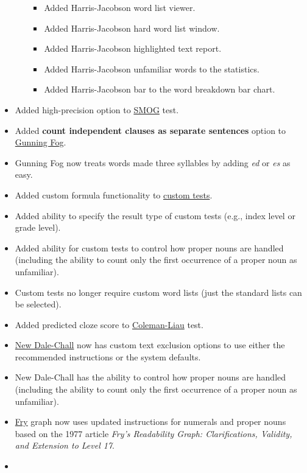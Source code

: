 \documentclass[
]{book}
\providecommand{\tightlist}{%
  \setlength{\itemsep}{0pt}\setlength{\parskip}{0pt}}
\theoremstyle{definition}
\theoremstyle{definition}
\theoremstyle{definition}
\theoremstyle{definition}
\theoremstyle{remark}
\begin{document}
\begin{itemize}
\begin{itemize}
    \begin{itemize}
    \tightlist
    \item
      Added Harris-Jacobson word list viewer.
    \item
      Added Harris-Jacobson hard word list window.
    \item
      Added Harris-Jacobson highlighted text report.
    \item
      Added Harris-Jacobson unfamiliar words to the statistics.
    \item
      Added Harris-Jacobson bar to the word breakdown bar chart.
    \end{itemize}
  \end{itemize}
\item
  Added high-precision option to \protect\hyperlink{smog-test}{SMOG} test.
\item
  Added \textbf{count independent clauses as separate sentences} option to \protect\hyperlink{gunning-fog-test}{Gunning Fog}.
\item
  Gunning Fog now treats words made three syllables by adding \emph{ed} or \emph{es} as easy.
\item
  Added custom formula functionality to \protect\hyperlink{creating-custom-test}{custom tests}.
\item
  Added ability to specify the result type of custom tests (e.g., index level or grade level).
\item
  Added ability for custom tests to control how proper nouns are handled (including the ability to count only the first occurrence of a proper noun as unfamiliar).
\item
  Custom tests no longer require custom word lists (just the standard lists can be selected).
\item
  Added predicted cloze score to \protect\hyperlink{coleman-liau-test}{Coleman-Liau} test.
\item
  \protect\hyperlink{dale-chall-test}{New Dale-Chall} now has custom text exclusion options to use either the recommended instructions or the system defaults.
\item
  New Dale-Chall has the ability to control how proper nouns are handled (including the ability to count only the first occurrence of a proper noun as unfamiliar).
\item
  \protect\hyperlink{fry-test}{Fry} graph now uses updated instructions for numerals and proper nouns based on the 1977 article \emph{Fry's Readability Graph: Clarifications, Validity, and Extension to Level 17}.
\item

\end{itemize}
\end{document}
